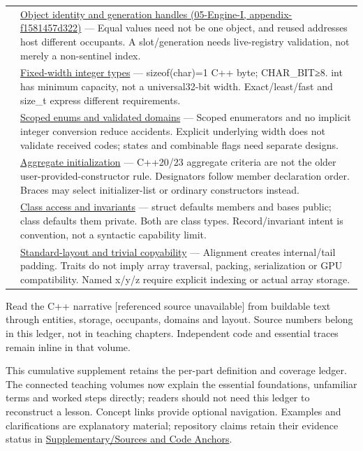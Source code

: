 {\begin{longtable}[]{@{}
  >{\raggedright\arraybackslash}p{}
  >{\raggedright\arraybackslash}p{}@{}}
107 & \href{../05-Engine-I/main.pdf\#nameddest=appendix-f1581457d322}{Object identity and generation handles (05-Engine-I, appendix-f1581457d322)} --- Equal values need not be one object, and reused addresses host different occupants. A slot/generation needs live-registry validation, not merely a non-sentinel index. \\
108 & \hyperref[appendix-cc04044b5782]{Fixed-width integer types} --- sizeof(char)=1 C++ byte; CHAR\_BIT≥8. int has minimum capacity, not a universal32-bit width. Exact/least/fast and size\_t express different requirements. \\
109 & \hyperref[appendix-23640fcee147]{Scoped enums and validated domains} --- Scoped enumerators and no implicit integer conversion reduce accidents. Explicit underlying width does not validate received codes; states and combinable flags need separate designs. \\
110 & \hyperref[appendix-b7174c179542]{Aggregate initialization} --- C++20/23 aggregate criteria are not the older user-provided-constructor rule. Designators follow member declaration order. Braces may select initializer-list or ordinary constructors instead. \\
111 & \hyperref[appendix-8e5214819615]{Class access and invariants} --- struct defaults members and bases public; class defaults them private. Both are class types. Record/invariant intent is convention, not a syntactic capability limit. \\
112 & \hyperref[appendix-958870a64c53]{Standard-layout and trivial copyability} --- Alignment creates internal/tail padding. Traits do not imply array traversal, packing, serialization or GPU compatibility. Named x/y/z require explicit indexing or actual array storage. \\
\end{longtable}
}

Read {the C++ narrative {[}referenced source unavailable{]}} from buildable text through entities, storage, occupants, domains and layout. Source numbers belong in this ledger, not in teaching chapters. Independent code and essential traces remain inline in that volume.

This cumulative supplement retains the per-part definition and coverage ledger. The connected teaching volumes now explain the essential foundations, unfamiliar terms and worked steps directly; readers should not need this ledger to reconstruct a lesson. Concept links provide optional navigation. Examples and clarifications are explanatory material; repository claims retain their evidence status in \hyperref[appendix-a103e7846d21]{Supplementary/Sources and Code Anchors}.

